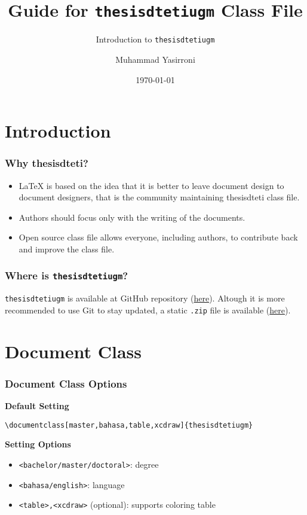 \documentclass{beamer}
\title{Guide for \texttt{thesisdtetiugm} Class File}
\subtitle{Introduction to \texttt{thesisdtetiugm}}
\author{Muhammad Yasirroni}
\institute{Universitas Gadjah Mada}
\date{\today}
\begin{document}
\begin{frame}
  \titlepage
\end{frame}

\section{Introduction}
\begin{frame}
    \frametitle{Why thesisdteti?}
    \begin{itemize}
      \item LaTeX is based on the idea that it is better to leave document design to document designers, that is the community maintaining thesisdteti class file.
      \item Authors should focus only with the writing of the documents.
      \item Open source class file allows everyone, including authors, to contribute back and improve the class file.
    \end{itemize}
\end{frame}

\begin{frame}
  \frametitle{Where is \texttt{thesisdtetiugm}?}
  \texttt{thesisdtetiugm} is available at GitHub repository (\href{https://github.com/yasirroni/thesisdtetiugm}{here}). Altough it is more recommended to use Git to stay updated, a static \texttt{.zip} file is available (\href{https://github.com/yasirroni/thesisdtetiugm/archive/refs/heads/master.zip}{here}).
\end{frame}

\section{Document Class}

\begin{frame}[fragile]
  \frametitle{Document Class Options}

  \textbf{Default Setting}

  \begin{block}{}
    \vspace{-2em}
    \small
    \begin{verbatim}
\documentclass[master,bahasa,table,xcdraw]{thesisdtetiugm}
    \end{verbatim}
  \end{block}

  \textbf{Setting Options}

  \begin{itemize}
    \item \texttt{<bachelor/master/doctoral>}: degree
    \item \texttt{<bahasa/english>}: language
    \item \texttt{<table>,<xcdraw>} (optional): supports coloring table
  \end{itemize}

\end{frame}
\end{document}
